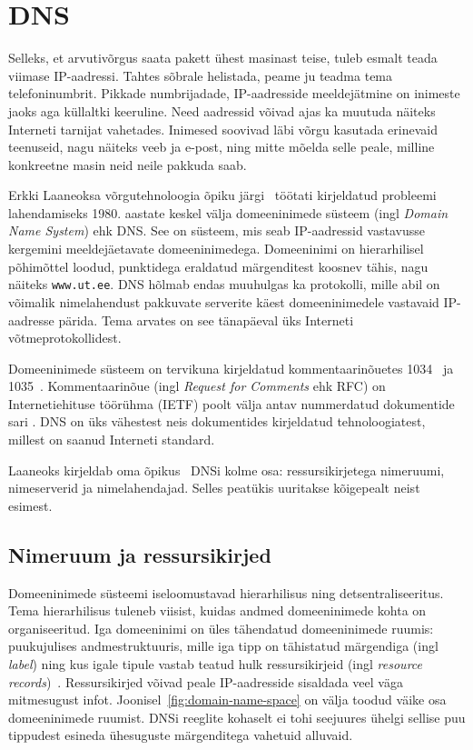 \documentclass[../main.tex]{subfiles}
\begin{document}
\newpage
\section{DNS}

Selleks, et arvutivõrgus saata pakett ühest masinast teise, tuleb esmalt teada viimase IP-aadressi.
Tahtes sõbrale helistada, peame ju teadma tema telefoninumbrit.
Pikkade numbrijadade, IP-aadresside meeldejätmine on inimeste jaoks aga küllaltki keeruline.
Need aadressid võivad ajas ka muutuda näiteks Interneti tarnijat vahetades.
Inimesed soovivad läbi võrgu kasutada erinevaid teenuseid, nagu näiteks veeb ja e-post, ning mitte mõelda selle peale, milline konkreetne masin neid neile pakkuda saab.

Erkki Laaneoksa võrgutehnoloogia õpiku järgi~\cite{laaneoks2010} töötati kirjeldatud probleemi lahendamiseks 1980. aastate keskel välja domeeninimede süsteem (ingl \textit{Domain Name System}) ehk DNS.
See on süsteem, mis seab IP-aadressid vastavusse kergemini meeldejäetavate domeeninimedega.
Domeeninimi on hierarhilisel põhimõttel loodud, punktidega eraldatud märgenditest koosnev tähis, nagu näiteks \texttt{www.ut.ee}.
DNS hõlmab endas muuhulgas ka protokolli, mille abil on võimalik nimelahendust pakkuvate serverite käest domeeninimedele vastavaid IP-aadresse pärida.
Tema arvates on see tänapäeval üks Interneti võtmeprotokollidest.

Domeeninimede süsteem on tervikuna kirjeldatud kommentaarinõuetes 1034~\cite{rfc1034} ja 1035~\cite{rfc1035}.
Kommentaarinõue (ingl \textit{Request for Comments} ehk RFC) on Internetiehituse töörühma (IETF) poolt välja antav nummerdatud dokumentide sari \cite{ietf}.
DNS on üks vähestest neis dokumentides kirjeldatud tehnoloogiatest, millest on saanud Interneti standard.

Laaneoks kirjeldab oma õpikus~\cite{laaneoks2010} DNSi kolme osa: ressursikirjetega nimeruumi, nimeserverid ja nimelahendajad.
Selles peatükis uuritakse kõigepealt neist esimest.


\subsection{Nimeruum ja ressursikirjed}

Domeeninimede süsteemi iseloomustavad hierarhilisus ning detsentraliseeritus.
Tema hierarhilisus tuleneb viisist, kuidas andmed domeeninimede kohta on organiseeritud.
Iga domeeninimi on üles tähendatud domeeninimede ruumis: puukujulises andmestruktuuris, mille iga tipp on tähistatud märgendiga (ingl \textit{label}) ning kus igale tipule vastab teatud hulk ressursikirjeid (ingl \textit{resource records})~\cite{rfc1034}.
Ressursikirjed võivad peale IP-aadresside sisaldada veel väga mitmesugust infot.
Joonisel~\ref{fig:domain-name-space} on välja toodud väike osa domeeninimede ruumist.
DNSi reeglite kohaselt ei tohi seejuures ühelgi sellise puu tippudest esineda ühesuguste märgenditega vahetuid alluvaid.
\end{document}

